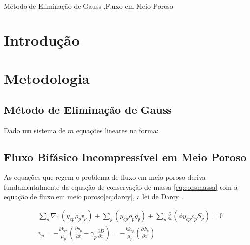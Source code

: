 \documentclass[final,5p]{elsarticle}
\numberwithin{equation}{section}
\begin{document}
\begin{frontmatter}

\begin{keyword}
    Método de Eliminação de Gauss \sep Fluxo em Meio Poroso



\end{keyword}

\end{frontmatter}


\section{Introdução}



\section{Metodologia}

    \subsection{Método de Eliminação de Gauss}


        Dado um sistema de $m$ equações lineares na forma:



    \subsection{Fluxo Bifásico Incompressível em Meio Poroso}

        As equações que regem o problema de fluxo em meio poroso deriva fundamentalmente da equação de conservação de massa \ref{eq:consmassa} com a equação de fluxo em meio poroso\ref{eq:darcy}, a lei de Darcy \cite{dake1983fundamentals}.

        \begin{align}
            &\sum_{p} \nabla \cdot  (y_{cp} \rho_p v_p) + \sum_{p} (y_{cp} \rho_p q_p) + \sum_{p} \frac{\partial}{\partial t} \left( \phi y_{cp} \rho_p S_p\right) = 0 \label{eq:consmassa} \\
            &v_p = - \frac{k k_{rp}}{\mu_p} \left( \frac{\partial p_p}{\partial x} - \gamma_p \frac{\partial D}{\partial x} \right) = - \frac{k k_{rp}}{\mu_p} \left( \frac{\partial \Phi_p}{\partial x} \right)\label{eq:darcy}
        \end{align}
\end{document}
